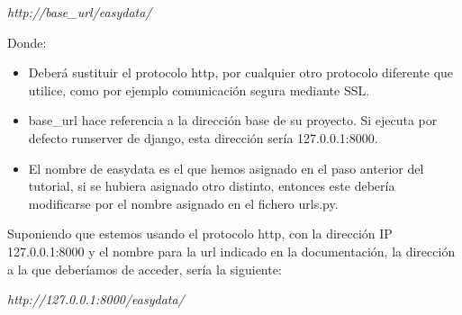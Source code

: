\begin{center}
\textit{http://base\_url/easydata/}
\end{center}

Donde:
\begin{itemize}
    \item Deberá sustituir el protocolo http, por cualquier otro protocolo
    diferente que utilice, como por ejemplo comunicación segura mediante SSL.
    \item base\_url hace referencia a la dirección base de su proyecto. Si
    ejecuta por defecto runserver de django, esta dirección sería 127.0.0.1:8000.
    \item El nombre de easydata es el que hemos asignado en el paso anterior
    del tutorial, si se hubiera asignado otro distinto, entonces este debería
    modificarse por el nombre asignado en el fichero urls.py.
\end{itemize}

Suponiendo que estemos usando el protocolo http, con la dirección IP
127.0.0.1:8000 y el nombre para la url indicado en la documentación, la
dirección a la que deberíamos de acceder, sería la siguiente:

\begin{center}
\textit{http://127.0.0.1:8000/easydata/}
\end{center}
